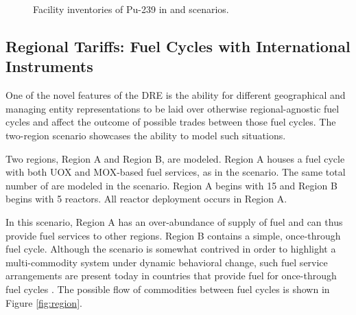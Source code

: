 \begin{figure}
  \centering
  \begin{minipage}{0.67\textwidth}
    \centering 
    \vfill 
  \end{minipage}%
  \begin{minipage}{0.33\textwidth}
    \centering
  \end{minipage}%
  \caption[]{
    \label{fig:military}
    Facility inventories of Pu-239 in \basecase and \external scenarios.}
\end{figure}

\subsection{Regional Tariffs: Fuel Cycles with International Instruments}

One of the novel features of the DRE is the ability for different geographical
and managing entity representations to be laid over otherwise regional-agnostic
fuel cycles and affect the outcome of possible trades between those fuel
cycles. The \tariff two-region scenario showcases the ability to model
such situations.

Two regions, Region A and Region B, are modeled. Region A houses a fuel cycle
with both UOX and MOX-based fuel services, as in the \basecase scenario. The
same total number of \reactors are modeled in the scenario. Region A begins with
15 \reactors and Region B begins with 5 reactors. All reactor deployment occurs
in Region A.

In this scenario, Region A has an over-abundance of supply of fuel and can thus
provide fuel services to other regions. Region B contains a simple, once-through
fuel cycle. Although the scenario is somewhat contrived in order to highlight a
multi-commodity system under dynamic behavioral change, such fuel service
arrangements are present today in countries that provide fuel for once-through
fuel cycles . The possible flow of
commodities between fuel cycles is shown in Figure \ref{fig:region}.

